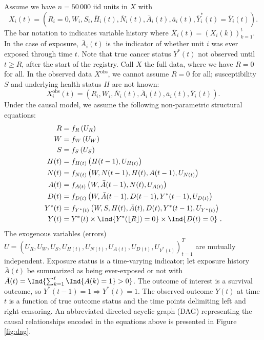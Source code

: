 \documentclass[
  11pt,
]{article}
\begin{document}
Assume we have \(n = 50\,000\) iid units in \(X\) with
\[X_i(t) = \left(R_i = 0, W_i, S_i, \bar H_i(t), \bar N_i(t), \bar A_i(t), \bar a_i(t), \bar Y^*_i(t) = \bar Y_i(t) \right).\]
The bar notation to indicates variable history where
\(\bar X_i(t) = \left(X_i(k)\right)_{k = 1}^t\). In the case of
exposure, \(\bar A_i(t)\) is the indicator of whether unit \(i\) was
ever exposed through time \(t\). Note that true cancer status \(Y^*(t)\)
not observed until \(t \ge R\), after the start of the registry. Call
\(X\) the full data, where we have \(R = 0\) for all. In the observed
data \(X^\text{obs}\), we cannot assume \(R = 0\) for all;
susceptibility \(S\) and underlying health status \(H\) are not known:
\[X^\text{obs}_i(t) = \left(R_i, W_i, \bar N_i(t), \bar A_i(t), \bar a_i(t), \bar Y_i(t) \right).\]
Under the causal model, we assume the following non-parametric
structural equations: \[\begin{aligned}
R     & = f_R \left( U_R \right) \\
W     & = f_W \left( U_W \right) \\
S     & = f_S \left( U_S \right) \\
H(t)  & = f_{H(t)} \left( H(t - 1), U_{H(t)} \right) \\
N(t)  & = f_{N(t)} \left( W, N(t - 1), H(t), A(t - 1), U_{N(t)} \right) \\
A(t)  & = f_{A(t)} \left( W, \bar A(t - 1), N(t), U_{A(t)} \right) \\
D(t)  & = f_{D(t)} \left( W, \bar A(t - 1), D(t - 1), Y^*(t - 1), U_{D(t)} \right) \\
Y^*(t)& = f_{Y^*(t)} \left(W, S, H(t), \bar A (t), D(t), Y^*(t - 1), U_{Y^*(t)} \right) \\
Y(t) & = Y^*(t) \times \Ind{Y^*(\lfloor R \rfloor) = 0} \times \Ind{D(t) = 0} \ .
\end{aligned}\] The exogenous variables (errors)
\(U = \left( U_R, U_W, U_S, U_{H(t)}, U_{N(t)}, U_{A(t)}, U_{D(t)}, U_{Y^*(t)} \right)_{t = 1}^{T}\)
are mutually independent. Exposure status is a time-varying indicator;
let exposure history \(\bar A(t)\) be summarized as being ever-exposed
or not with \(\bar A(t) = \Ind{\sum_{k = 1}^t\Ind{A(k) = 1} > 0}\). The
outcome of interest is a survival outcome, so
\(Y^*(t - 1) = 1 \Rightarrow Y^*(t) = 1\). The observed outcome \(Y(t)\)
at time \(t\) is a function of true outcome status and the time points
delimiting left and right censoring. An abbreviated directed acyclic
graph (DAG) representing the causal relationships encoded in the
equations above is presented in Figure \ref{fig:dag}.
\end{document}
